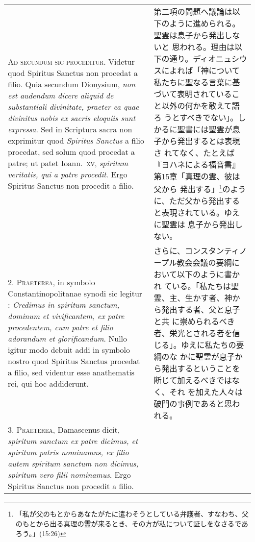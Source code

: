 \documentclass[10pt]{jsarticle} %
\begin{document}
\begin{longtable}{p{21em}p{21em}}
{\scshape Ad secundum sic proceditur}. Videtur quod Spiritus Sanctus
non procedat a filio. Quia secundum Dionysium, {\itshape non est audendum dicere
aliquid de substantiali divinitate, praeter ea quae divinitus nobis ex
sacris eloquiis sunt expressa}. Sed in Scriptura sacra non exprimitur
quod {\itshape Spiritus Sanctus} a filio procedat, sed solum quod
procedat a patre; ut patet Ioann.~{\scshape xv}, {\itshape spiritum veritatis, qui a patre
procedit}. Ergo Spiritus Sanctus non procedit a filio.

&

第二項の問題へ議論は以下のように進められる。聖霊は息子から発出しないと
 思われる。理由は以下の通り。ディオニュシウスによれば「神について
 私たちに聖なる言葉に基づいて表明されていること以外の何かを敢えて語ろ
 うとすべきでない」。しかるに聖書には聖霊が息子から発出するとは表現さ
 れてなく、たとえば『ヨハネによる福音書』第15章「真理の霊、彼は父から
 発出する」\footnote{「私が父のもとからあなたがたに遣わそうとしている弁護者、すなわち、父のもとから出る真理の霊が来るとき、その方が私について証しをなさるであろう。」(15:26)}のように、ただ父から発出すると表現されている。ゆえに聖霊は
 息子から発出しない。


\\



2. {\scshape Praeterea}, in symbolo Constantinopolitanae synodi sic
 legitur :
{\itshape Credimus in spiritum sanctum, dominum et vivificantem, ex patre
procedentem, cum patre et filio adorandum et glorificandum}. Nullo
igitur modo debuit addi in symbolo nostro quod Spiritus
Sanctus procedat a filio, sed videntur esse anathematis rei, qui hoc
addiderunt.

&

さらに、コンスタンティノープル教会会議の要綱において以下のように書かれ
 ている。「私たちは聖霊、主、生かす者、神から発出する者、父と息子と共
 に崇められるべき者、栄光とされる者を信じる」。ゆえに私たちの要綱のな
 かに聖霊が息子から発出するということを断じて加えるべきではなく、それ
 を加えた人々は破門の事例であると思われる。

\\



3. {\scshape Praeterea}, Damascenus dicit, {\itshape spiritum sanctum ex patre dicimus, et
spiritum patris nominamus, ex filio autem spiritum sanctum non
dicimus, spiritum vero filii nominamus}. Ergo Spiritus
Sanctus non procedit a filio.


\end{longtable}
\end{document}
